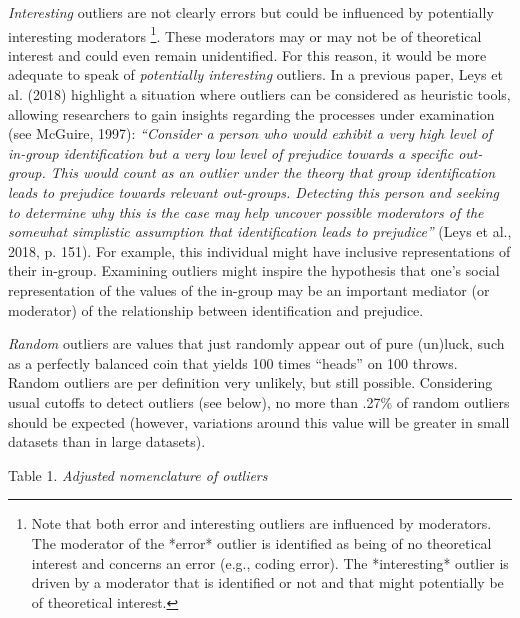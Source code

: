 \documentclass[man,floatsintext]{apa6}
\let\rmarkdownfootnote\footnote%
\def\footnote{\protect\rmarkdownfootnote}
\begin{document}
\emph{Interesting} outliers are not clearly errors but could be influenced by potentially interesting moderators \footnote{Note that both error and interesting outliers are influenced by moderators. The moderator of the *error* outlier is identified as being of no theoretical interest and concerns an error (e.g., coding error). The *interesting* outlier is driven by a moderator that is identified or not and that might potentially be of theoretical interest.}. These moderators may or may not be of theoretical interest and could even remain unidentified. For this reason, it would be more adequate to speak of \emph{potentially interesting} outliers. In a previous paper, Leys et al. (2018) highlight a situation where outliers can be considered as heuristic tools, allowing researchers to gain insights regarding the processes under examination (see McGuire, 1997): \emph{\enquote{Consider a person who would exhibit a very high level of in-group identification but a very low level of prejudice towards a specific out-group. This would count as an outlier under the theory that group identification leads to prejudice towards relevant out-groups. Detecting this person and seeking to determine why this is the case may help uncover possible moderators of the somewhat simplistic assumption that identification leads to prejudice}} (Leys et al., 2018, p. 151). For example, this individual might have inclusive representations of their in-group. Examining outliers might inspire the hypothesis that one's social representation of the values of the in-group may be an important mediator (or moderator) of the relationship between identification and prejudice.

\emph{Random} outliers are values that just randomly appear out of pure (un)luck, such as a perfectly balanced coin that yields 100 times \enquote{heads} on 100 throws. Random outliers are per definition very unlikely, but still possible. Considering usual cutoffs to detect outliers (see below), no more than .27\% of random outliers should be expected (however, variations around this value will be greater in small datasets than in large datasets).

Table 1.
\emph{Adjusted nomenclature of outliers}
\end{document}
